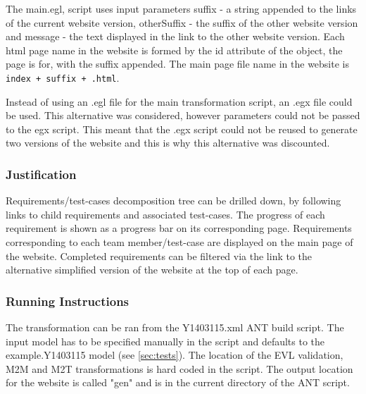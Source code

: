 \documentclass[11pt,a4paper]{article}
\begin{document}
	The main.egl, script uses input parameters suffix -  a string appended to the links of the current website version, otherSuffix - the suffix of the other website version and message - the text displayed in the link to the other website version. Each html page name in the website is formed by the id attribute of the object, the page is for, with the suffix appended. The main page file name in the website is \texttt{index + suffix + .html}.
	
	Instead of using an .egl file for the main transformation script, an .egx file could be used. This alternative was considered, however parameters could not be passed to the egx script. This meant that the .egx script could not be reused to generate two versions of the website and this is why this alternative was discounted.
	
	\subsubsection{Justification}
	Requirements/test-cases decomposition tree can be drilled down, by following links to child requirements and associated test-cases. 	The progress of each requirement is shown as a progress bar on its corresponding page. Requirements corresponding to each team member/test-case are displayed on the main page of the website. Completed requirements can be filtered via the link to the alternative simplified version of the website at the top of each page.
	
	\subsubsection{Running Instructions}
	The transformation can be ran from the Y1403115.xml ANT build script. The input model has to be specified manually in the script and defaults to the example.Y1403115 model (see \autoref{sec:tests}). The location of the EVL validation, M2M and M2T transformations is hard coded in the script. The output location for the website is called "gen" and is in the current directory of the ANT script. 
	
\printbibliography
\end{document}
